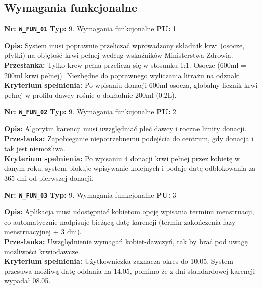 \documentclass[11pt, a4paper]{article}
\newcommand{\req}[1]{\texttt{#1}}
\begin{document}
\subsection{Wymagania funkcjonalne}

\begin{mdframed}[style=reqheader]
  \textbf{Nr: \req{W\_FUN\_01}} \hfill \textbf{Typ:} 9. Wymagania funkcjonalne \hfill \textbf{PU:} 1
\end{mdframed}
\begin{mdframed}[style=reqcard]
  \textbf{Opis:} System musi poprawnie przeliczać wprowadzony składnik krwi (osocze, płytki) na objętość krwi pełnej według wskaźników Ministerstwa Zdrowia. \\
  \textbf{Przesłanka:} Tylko krew pełna przelicza się w stosunku 1:1. Osocze (600ml = 200ml krwi pełnej). Niezbędne do poprawnego wyliczania litrażu na odznaki. \\
  \textbf{Kryterium spełnienia:} Po wpisaniu donacji 600ml osocza, globalny licznik krwi pełnej w profilu dawcy rośnie o dokładnie 200ml (0.2L).
\end{mdframed}

\begin{mdframed}[style=reqheader]
  \textbf{Nr: \req{W\_FUN\_02}} \hfill \textbf{Typ:} 9. Wymagania funkcjonalne \hfill \textbf{PU:} 2
\end{mdframed}
\begin{mdframed}[style=reqcard]
  \textbf{Opis:} Algorytm karencji musi uwzględniać płeć dawcy i roczne limity donacji. \\
  \textbf{Przesłanka:} Zapobieganie niepotrzebnemu podejścia do centrum, gdy donacja i tak jest niemożliwa. \\
  \textbf{Kryterium spełnienia:} Po wpisaniu 4 donacji krwi pełnej przez kobietę w danym roku, system blokuje wpisywanie kolejnych i podaje datę odblokowania za 365 dni od pierwszej donacji.
\end{mdframed}

\begin{mdframed}[style=reqheader]
  \textbf{Nr: \req{W\_FUN\_03}} \hfill \textbf{Typ:} 9. Wymagania funkcjonalne \hfill \textbf{PU:} 3
\end{mdframed}
\begin{mdframed}[style=reqcard]
  \textbf{Opis:} Aplikacja musi udostępniać kobietom opcję wpisania terminu menstruacji, co automatycznie nadpisuje bieżącą datę karencji (termin zakończenia fazy menstruacyjnej + 3 dni). \\
  \textbf{Przesłanka:} Uwzględnienie wymagań kobiet-dawczyń, tak by brać pod uwagę możliwości krwiodawcze. \\
  \textbf{Kryterium spełnienia:} Użytkowniczka zaznacza okres do 10.05. System przesuwa możliwą datę oddania na 14.05, pomimo że z dni standardowej karencji wypadał 08.05.
\end{mdframed}
\end{document}

